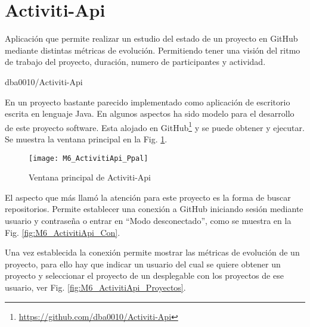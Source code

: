
\section{Activiti-Api}

\epigraph{Aplicación que permite realizar un estudio del estado de un proyecto en GitHub mediante distintas métricas de evolución. Permitiendo tener una visión del ritmo de trabajo del proyecto, duración, numero de participantes y actividad.}{dba0010/Activiti-Api}

En un proyecto bastante parecido implementado como aplicación de escritorio escrita en lenguaje Java. En algunos aspectos ha sido modelo para el desarrollo de este proyecto software. Esta alojado en GitHub\footnote{\url{https://github.com/dba0010/Activiti-Api}} y se puede obtener y ejecutar. Se muestra la ventana principal en la Fig. \ref{fig:M6_ActivitiApi_Ppal}.

\begin{figure}[h!]
	\centering
	\texttt{[image: M6\_ActivitiApi\_Ppal]}
	\caption{Ventana principal de Activiti-Api}\label{fig:M6_ActivitiApi_Ppal}
\end{figure}

El aspecto que más llamó la atención para este proyecto es la forma de buscar repositorios. Permite establecer una conexión a GitHub iniciando sesión mediante usuario y contraseña o entrar en ``Modo desconectado'', como se muestra en la Fig. \ref{fig:M6_ActivitiApi_Con}.


Una vez establecida la conexión permite mostrar las métricas de evolución de un proyecto, para ello hay que indicar un usuario del cual se quiere obtener un proyecto y seleccionar el proyecto de un desplegable con los proyectos de ese usuario, ver Fig. \ref{fig:M6_ActivitiApi_Proyectos}.


